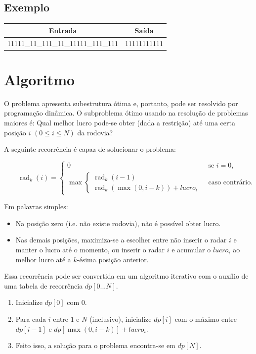 \documentclass[a4paper]{article}
\newcommand{\sample}[2]{
    \begin{center}
        \begin{tabular}{ | c | c | }
            \hline
            Entrada & Saída \\ \hline
            \begin{minipage}{0.4\textwidth}#1\end{minipage} & \begin{minipage}{0.4\textwidth}#2\end{minipage} \\ \hline
        \end{tabular}
    \end{center}
}
\begin{document}
    \subsection{Exemplo}
    \sample{11111\_11\_111\_11\_11111\_111\_111}{11111111111}

\section{Algoritmo}

O problema apresenta subestrutura ótima e, portanto, pode ser resolvido por programação dinâmica. O subproblema ótimo usando na resolução de problemas maiores é: Qual melhor lucro pode-se obter (dada a restrição) até uma certa posição $i$ $(0 \leq i \leq N)$ da rodovia?

A seguinte recorrência é capaz de solucionar o problema:

$\qquad\operatorname{rad}_k(i) = \begin{cases}
  0 & \text{ se } i=0, \\
  \max \begin{cases}
          \operatorname{rad}_k(i-1) \\
          \operatorname{rad}_k(\max(0, i-k)) + lucro_i
       \end{cases} & \text{ caso contrário.}
\end{cases}$

\bigskip
Em palavras simples:
\begin{itemize}
\item Na posição zero (i.e. não existe rodovia), não é possível obter lucro.
\item Nas demais posições, maximiza-se a escolher entre não inserir o radar $i$ e manter o lucro até o momento, ou inserir o radar $i$ e acumular o $lucro_i$ ao melhor lucro até a $k$-ésima posição anterior.
\end{itemize}

Essa recorrência pode ser convertida em um algoritmo iterativo com o auxílio de uma tabela de recorrência $dp[0...N]$.

\begin{enumerate}
\item Inicialize $dp[0]$ com $0$.
\item Para cada $i$ entre $1$ e $N$ (inclusivo), inicialize $dp[i]$ com o máximo entre $dp[i-1]$ e $dp[\max(0, i-k)] + lucro_i$.
\item Feito isso, a solução para o problema encontra-se em $dp[N]$.
\end{enumerate}
\end{document}
